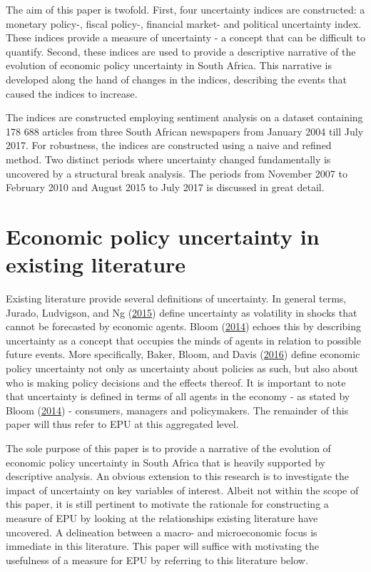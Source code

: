 \documentclass[11pt,preprint, authoryear]{elsarticle}
\numberwithin{equation}{section}
\numberwithin{figure}{section}
\numberwithin{table}{section}
\begin{document}
The aim of this paper is twofold. First, four uncertainty indices are constructed: a monetary policy-, fiscal policy-, financial market- and political uncertainty index. These indices provide a measure of uncertainty - a concept that can be difficult to quantify. Second, these indices are used to provide a descriptive narrative of the evolution of economic policy uncertainty in South Africa. This narrative is developed along the hand of changes in the indices, describing the events that caused the indices to increase. 

The indices are constructed employing sentiment analysis on a dataset
containing 178 688 articles from three South African newspapers from January 2004 till July 2017. For
robustness, the indices are constructed using a naive and refined method. Two distinct periods where uncertainty changed fundamentally is uncovered by a structural break analysis. The periods from November 2007 to February
2010 and August 2015 to July 2017 is discussed in great detail. 

\section{\texorpdfstring{Economic policy uncertainty in existing
literature
\label{sec_litreview}}{Economic policy uncertainty in existing literature }}\label{economic-policy-uncertainty-in-existing-literature}

Existing literature provide several definitions of uncertainty. In
general terms, Jurado, Ludvigson, and Ng
(\protect\hyperlink{ref-Jurado2015}{2015}) define uncertainty as
volatility in shocks that cannot be forecasted by economic agents. Bloom
(\protect\hyperlink{ref-Bloom2014}{2014}) echoes this by describing
uncertainty as a concept that occupies the minds of agents in relation
to possible future events. More specifically, Baker, Bloom, and Davis
(\protect\hyperlink{ref-Baker2016}{2016}) define economic policy
uncertainty not only as uncertainty about policies as such, but also
about who is making policy decisions and the effects thereof. It is
important to note that uncertainty is defined in terms of all agents in
the economy - as stated by Bloom
(\protect\hyperlink{ref-Bloom2014}{2014}) - consumers, managers and
policymakers. The remainder of this paper will thus refer to EPU at this
aggregated level.

The sole purpose of this paper is to provide a narrative of the
evolution of economic policy uncertainty in South Africa that is heavily
supported by descriptive analysis. An obvious extension to this research
is to investigate the impact of uncertainty on key variables of
interest. Albeit not within the scope of this paper, it is still
pertinent to motivate the rationale for constructing a measure of EPU by
looking at the relationships existing literature have uncovered. A
delineation between a macro- and microeconomic focus is immediate in
this literature. This paper will suffice with motivating the usefulness
of a measure for EPU by referring to this literature below.
\end{document}
